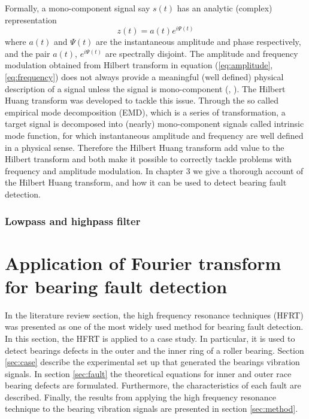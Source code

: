 \documentclass[../Main/thesis.tex]{subfiles}
\begin{document}
Formally, a mono-component signal say $s(t)$ has an analytic (complex) representation 
\begin{equation}
	z(t) = a(t)e^{i \Psi(t)} 
\end{equation}
where $a(t)$ and $\Psi(t)$ are the instantaneous amplitude and phase respectively,
and the pair $a(t)$, $e^{i \Psi(t)}$ are spectrally disjoint.
The amplitude and frequency modulation obtained from Hilbert transform in equation (\ref{eq:amplitude}, \ref{eq:frequency}) does not always provide a meaningful (well defined) physical description of a signal unless the signal is mono-component (\cite{huang98}, \cite{huang08}). The Hilbert Huang transform was developed to tackle this issue. Through the so called empirical mode decomposition (EMD), which is a series of transformation, a target signal is decomposed into (nearly) mono-component signals called intrinsic mode function, for which instantaneous amplitude and frequency are well defined in a physical sense. Therefore the Hilbert Huang transform add value to the Hilbert transform and both make it possible to correctly tackle problems with frequency and amplitude modulation. In chapter 3 we give a thorough account of the Hilbert Huang transform, and how it can be used to detect bearing fault detection. 
\justify
  


\subsubsection{Lowpass and highpass filter}
\label{sec:other-filters}


\clearpage


\section{Application of Fourier transform for bearing fault detection}
\label{sec:application}
In the literature review section, the high frequency resonance techniques (HFRT) was presented as one of the most widely used method for bearing fault detection. In this section, the HFRT is applied to a case study. In particular, it is used to detect bearings defects in the outer and the inner ring of a roller bearing.
\justify
Section \ref{sec:case} describe the experimental set up that generated the bearings vibration signals. In section \ref{sec:fault} the theoretical equations for inner and outer race bearing defects are formulated. Furthermore, the characteristics of each fault are described.
Finally, the results from applying the high frequency resonance technique to the bearing vibration signals are presented in section \ref{sec:method}.
\end{document}
